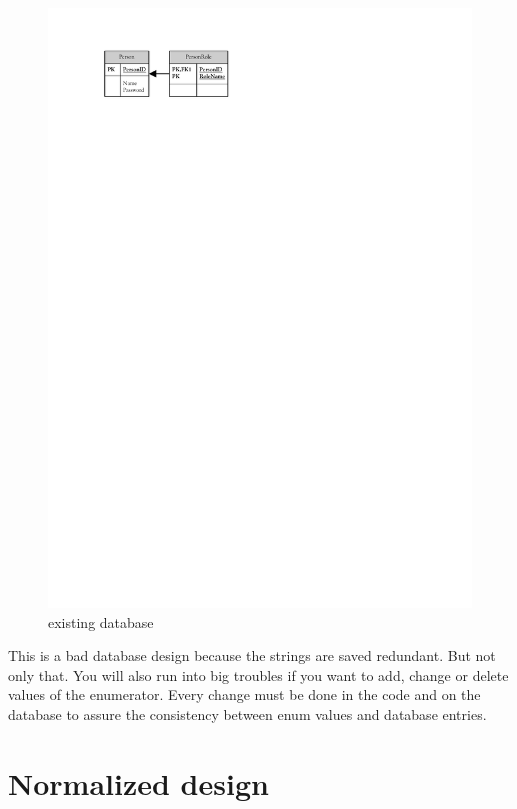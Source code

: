 		\begin{figure}[hbt]
			\begin{center}
				\includegraphics{./files/inc/figures/AnalysisEnumOld}
				\caption{\label{fig:AnalysisEnumOld} existing database}
			\end{center}
		\end{figure}
		
		This is a bad database design because the strings are saved redundant. But not
		only that. You will also run into big troubles if you want to add, change or delete
		values of the enumerator. Every change must be done in the code and on the database 
		to assure the consistency between enum values and database entries.
		
	\section{Normalized design}
	
